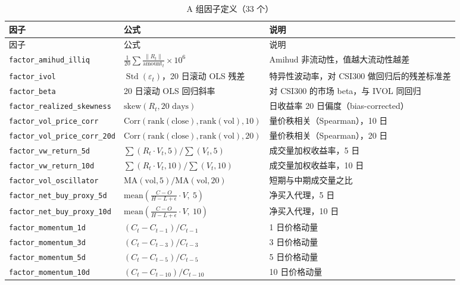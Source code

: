 \documentclass[12pt, a4paper, oneside]{article}
\newcommand{\Std}{\operatorname{Std}}
\begin{document}
\begin{longtable}{L{0.37\textwidth} L{0.30\textwidth} L{0.27\textwidth}}
\caption{A 组因子定义（33 个）}\label{tab:appendix-a}\\
\toprule
因子 & 公式 & 说明 \\
\midrule
\endfirsthead
\toprule
因子 & 公式 & 说明 \\
\midrule
\endhead
\bottomrule
\endfoot
\texttt{factor\_amihud\_illiq} & $\frac{1}{20}\sum\frac{\|R_t\|}{\text{amount}_t}\times 10^6$ & Amihud 非流动性，值越大流动性越差 \\
\texttt{factor\_ivol} & $\Std(\varepsilon_t)$，20 日滚动 OLS 残差 & 特异性波动率，对 CSI300 做回归后的残差标准差 \\
\texttt{factor\_beta} & 20 日滚动 OLS 回归斜率 & 对 CSI300 的市场 beta，与 IVOL 同回归 \\
\texttt{factor\_realized\_skewness} & $\mathrm{skew}(R_t,20\text{ days})$ & 日收益率 20 日偏度（bias-corrected） \\
\texttt{factor\_vol\_price\_corr} & $\mathrm{Corr}(\mathrm{rank}(\mathrm{close}), \mathrm{rank}(\mathrm{vol}), 10)$ & 量价秩相关（Spearman），10 日 \\
\texttt{factor\_vol\_price\_corr\_20d} & $\mathrm{Corr}(\mathrm{rank}(\mathrm{close}), \mathrm{rank}(\mathrm{vol}), 20)$ & 量价秩相关（Spearman），20 日 \\
\texttt{factor\_vw\_return\_5d} & $\sum(R_t \cdot V_t, 5) / \sum(V_t, 5)$ & 成交量加权收益率，5 日 \\
\texttt{factor\_vw\_return\_10d} & $\sum(R_t \cdot V_t, 10) / \sum(V_t, 10)$ & 成交量加权收益率，10 日 \\
\texttt{factor\_vol\_oscillator} & $\mathrm{MA}(\mathrm{vol}, 5) / \mathrm{MA}(\mathrm{vol}, 20)$ & 短期与中期成交量之比 \\
\texttt{factor\_net\_buy\_proxy\_5d} & $\mathrm{mean}\!\left(\frac{C-O}{H-L+\epsilon}\cdot V,\ 5\right)$ & 净买入代理，5 日 \\
\texttt{factor\_net\_buy\_proxy\_10d} & $\mathrm{mean}\!\left(\frac{C-O}{H-L+\epsilon}\cdot V,\ 10\right)$ & 净买入代理，10 日 \\
\texttt{factor\_momentum\_1d} & $(C_t - C_{t-1}) / C_{t-1}$ & 1 日价格动量 \\
\texttt{factor\_momentum\_3d} & $(C_t - C_{t-3}) / C_{t-3}$ & 3 日价格动量 \\
\texttt{factor\_momentum\_5d} & $(C_t - C_{t-5}) / C_{t-5}$ & 5 日价格动量 \\
\texttt{factor\_momentum\_10d} & $(C_t - C_{t-10}) / C_{t-10}$ & 10 日价格动量 \\

\end{longtable}
\end{document}
